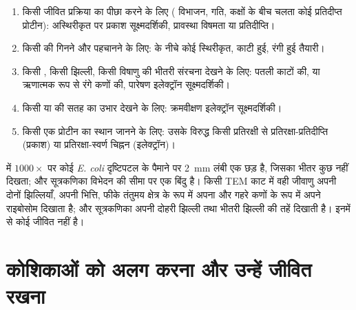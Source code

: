 \begin{method}[उपकरण चुनना]\label{met:b1:cell-unit-of-life:choose}
\begin{enumerate}
  \item किसी जीवित प्रक्रिया का पीछा करने के लिए ( विभाजन, गति,
        कक्षों के बीच चलता कोई प्रतिदीप्त प्रोटीन): अस्थिरीकृत
         पर प्रकाश सूक्ष्मदर्शिकी, प्रावस्था विषमता या
        प्रतिदीप्ति।
  \item किसी  की  गिनने और पहचानने के लिए:  के नीचे कोई स्थिरीकृत, काटी हुई, रंगी हुई तैयारी।
  \item किसी , किसी झिल्ली, किसी विषाणु की भीतरी संरचना देखने
        के लिए: पतली काटों की, या ऋणात्मक रूप से रंगे कणों की, पारेषण
        इलेक्ट्रॉन सूक्ष्मदर्शिकी।
  \item किसी  या  की सतह का उभार देखने के लिए: क्रमवीक्षण
        इलेक्ट्रॉन सूक्ष्मदर्शिकी।
  \item किसी एक प्रोटीन का स्थान जानने के लिए: उसके विरुद्ध किसी
        प्रतिरक्षी से प्रतिरक्षा-प्रतिदीप्ति (प्रकाश) या
        प्रतिरक्षा-स्वर्ण चिह्नन (इलेक्ट्रॉन)।
\end{enumerate}
\end{method}

\begin{example}[एक जीवाणु और एक सूत्रकणिका]\label{ex:b1:cell-unit-of-life:seeing}
 में $1000\times$ पर कोई \emph{E. coli} 
दृष्टिपटल के पैमाने पर \qty{2}{mm} लंबी एक छड़ है, जिसका भीतर कुछ नहीं
दिखता; और सूत्रकणिका विभेदन की सीमा पर एक बिंदु है। किसी TEM काट में वही
जीवाणु अपनी दोनों झिल्लियाँ, अपनी भित्ति, फीके तंतुमय क्षेत्र के रूप में
अपना  और गहरे कणों के रूप में अपने राइबोसोम दिखाता है; और
सूत्रकणिका अपनी दोहरी झिल्ली तथा भीतरी झिल्ली की तहें दिखाती है। इनमें
से कोई जीवित नहीं है।
\end{example}

\section{कोशिकाओं को अलग करना और उन्हें जीवित रखना}

